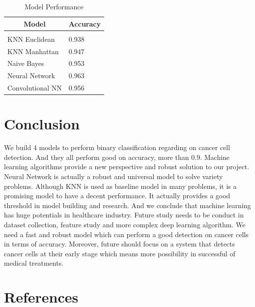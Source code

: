 \documentclass{article} %
\begin{document}
\begin{table}[H]
\caption{Model Performance}
\begin{center}
\begin{tabular}{ll}
\multicolumn{1}{c}{\bf Model}  &\multicolumn{1}{c}{\bf Accuracy}
\\ \hline \\
KNN Euclidean    & 0.938 \\
KNN Manhattan  & 0.947\\
Naive Bayes   & 0.953\\
Neural Network  & 0.963\\
Convolutional NN  & 0.956\\
\end{tabular}
\end{center}
\end{table}



\section{Conclusion}
We build 4 models to perform binary classification regarding on cancer cell detection. And they all perform good on accuracy, more than 0.9. Machine learning algorithms provide a new perspective and robust solution to our project. Neural Network is actually a robust and universal model to solve variety problems. Although KNN is used as baseline model in many problems, it is a promising model to have a decent performance. It actually provides a good threshold in model building and research. And we conclude that machine learning has huge potentials in healthcare industry. Future study needs to be conduct in dataset collection, feature study and more complex deep learning algorithm. We need a fast and robust model which can perform a good detection on cancer cells in terms of accuracy. Moreover, future should focus on a system that detects cancer cells at their early stage which means more possibility in successful of medical treatments.


\newpage
\section{References}
\end{document}

